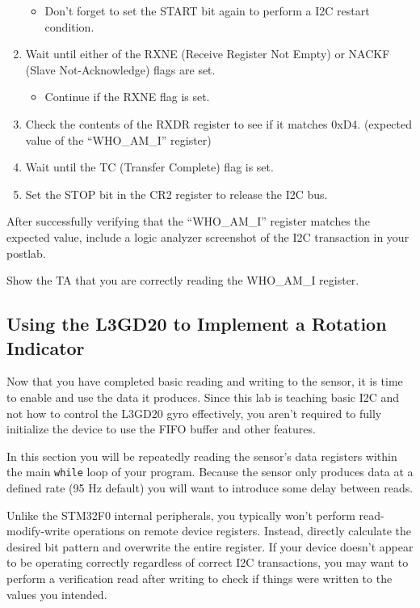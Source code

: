 \documentclass[openany,11pt,fleqn]{book} %
\begin{document}
\begin{exercise}
\begin{enumerate}
    \begin{itemize}
        \item Don't forget to set the START bit again to perform a I2C restart condition.
    \end{itemize}
    \item Wait until either of the RXNE (Receive Register Not Empty) or NACKF (Slave Not-Acknowledge) flags are set.
    \begin{itemize}
        \item Continue if the RXNE flag is set. 
    \end{itemize}
    \item Check the contents of the RXDR register to see if it matches 0xD4. (expected value of the ``WHO\_AM\_I'' register) 
    \item Wait until the TC (Transfer Complete) flag is set.
    \item Set the STOP bit in the CR2 register to release the I2C bus.
\end{enumerate}

After successfully verifying that the ``WHO\_AM\_I'' register matches the expected value, include a logic analyzer screenshot of the I2C transaction in your postlab.
\end{exercise}

\begin{assignment}
	Show the TA that you are correctly reading the WHO\_AM\_I register.
\end{assignment}
 
\subsection{\color{blue}Using the L3GD20 to Implement a Rotation Indicator}
Now that you have completed basic reading and writing to the sensor, it is time to enable and use the data it produces. Since this lab is teaching basic I2C and not how to control the L3GD20 gyro effectively, you aren't required to fully initialize the device to use the FIFO buffer and other features.

In this section you will be repeatedly reading the sensor's data registers within the main \texttt{while} loop of your program. Because the sensor only produces data at a defined rate (95 Hz default) you will want to introduce some delay between reads.

Unlike the STM32F0 internal peripherals, you typically won't perform read-modify-write operations on remote device registers. Instead, directly calculate the desired bit pattern and overwrite the entire register. If your device doesn't appear to be operating correctly regardless of correct I2C transactions, you may want to perform a verification read after writing to check if things were written to the values you intended. 
\end{document}
